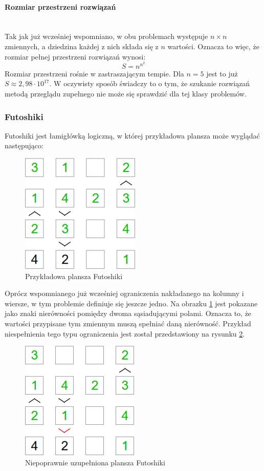 \documentclass{article}
\begin{document}
	\paragraph{Rozmiar przestrzeni rozwiązań}\mbox{}\\
	Tak jak już wcześniej wspomniano, w obu problemach występuje $n \times n$ zmiennych, a dziedzina każdej z nich składa się z $n$ wartości. Oznacza to więc, że rozmiar pełnej przestrzeni rozwiązań wynosi:
	\begin{equation}\label{eq:search_space_size}
		S = n^{n^{2}}
	\end{equation}
	Rozmiar przestrzeni rośnie w zastraszającym tempie. Dla $n=5$ jest to już $S \approx 2,98 \cdot 10^{17}$. W oczywisty sposób świadczy to o tym, że szukanie rozwiązań metodą przeglądu zupełnego nie może się sprawdzić dla tej klasy problemów.
	\subsubsection{Futoshiki}
	Futoshiki jest łamigłówką logiczną, w której przykładowa plansza może wyglądać następująco:
	\begin{figure}[H]
		\centering
		\includegraphics[width=0.3\linewidth]{futo.png}
		\caption{Przykładowa plansza Futoshiki}
		\label{fig:futoshiki_board}
	\end{figure}
	Oprócz wspomnianego już wcześniej ograniczenia nakładanego na kolumny i wiersze, w tym problemie definiuje się jeszcze jedno. Na obrazku \ref{fig:futoshiki_board} jest pokazane jako znaki nierówności pomiędzy dwoma sąsiadującymi polami. Oznacza to, że wartości przypisane tym zmiennym muszą spełniać daną nierówność. Przykład niespełnienia tego typu ograniczenia jest został przedstawiony na rysunku \ref{fig:futoshiki_board_incorrect}.
	\begin{figure}[H]
		\centering
		\includegraphics[width=0.3\linewidth]{futo2.png}
		\caption{Niepoprawnie uzupełniona plansza Futoshiki}
		\label{fig:futoshiki_board_incorrect}
	\end{figure}
\end{document}
